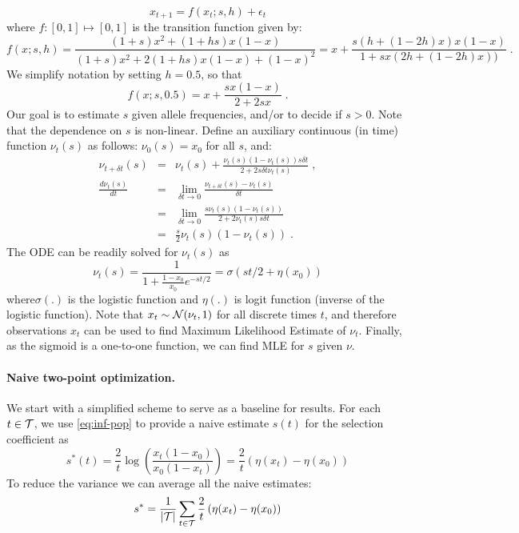 \begin{equation}
x_{t+1} = f(x_t;s,h) + \epsilon_t
\label{eq:trans0} 
\end{equation}
where $f: [0,1] \mapsto [0,1]$ is the
transition function given by:
\begin{equation}
f(x;s,h)=\frac{(1+s)x^2 + (1+hs)x(1-x)}{(1+s)x^2 + 2(1+hs)x(1-x) + (1-x)^2}
    =x+\frac{s(h+(1-2h)x)x(1-x)}{1+sx(2h+(1-2h)x))}\;.
\end{equation}
We simplify notation by setting $h=0.5$, so that
\begin{equation}
  f(x;s,0.5)=x+\frac{sx(1-x)}{2+2sx}\;.
  \label{eq:hequalshalf}
\end{equation}
Our goal is to estimate $s$ given allele frequencies, and/or to decide
if $s>0$. Note that the dependence on $s$ is non-linear. Define an
auxiliary continuous (in time) function $\nu_t(s)$ as follows:
$\nu_0(s)=x_0$ for all $s$, and:
\begin{eqnarray}
  \nu_{t+\delta t}(s) &=& \nu_t(s)+\frac{\nu_t(s)(1-\nu_t(s))s\delta t}{2+2s\delta t \nu_t(s)}\;,\\
  \frac{d\nu_t(s)}{dt} &=&\lim_{\delta t\rightarrow 0}\frac{\nu_{t+\delta t}(s) -\nu_t(s)}{\delta t}\\
   &=&\lim_{\delta t\rightarrow 0}\frac{s\nu_t(s)(1-\nu_t(s))}{2+2\nu_t(s)s\delta t}\\
   &=& \frac{s}{2}\nu_t(s)(1-\nu_t(s)) \;.
  \label{eq:ode}
\end{eqnarray}
The ODE can be readily solved for $\nu_t(s)$ as
\begin{equation}
  \nu_t(s) =\frac{1}{1+\frac{1-x_0}{x_0}e^{-st/2}} = \sigma(st/2+\eta(x_0)) 
  \label{eq:inf-pop}
\end{equation}
where$\sigma(.)$ is the logistic
function and $\eta(.)$ is logit function (inverse of the logistic function). Note that $x_t\sim{\cal N}(\nu_t,1)$ for all discrete times $t$,
and therefore observations $x_t$ can be used to find Maximum
Likelihood Estimate of $\nu_t$. Finally, as the sigmoid is a
one-to-one function, we can find MLE for $s$ given {\bf $\nu$}.

\paragraph{Naive two-point optimization.} We start with a simplified
scheme to serve as a baseline for results.  For each $t\in {\cal T}$, we
use \eqref{eq:inf-pop} to provide a naive estimate $s(t)$ for the
selection coefficient as
\begin{equation}
  s^*(t)=\frac{2}{t} \log \left( \frac{x_t(1-x_0)}{x_0 (1-x_t)} \right) = \frac{2}{t}  \left( \eta(x_t)-\eta(x_0)\right)
  \label{eq:naive2point}
\end{equation}
To reduce the variance we can average all the naive estimates: 
\begin{equation}
  s^*=\frac{1}{|{\cal T}|}\sum_{t\in {\cal T}}\frac{2}{t}  \left( \eta(x_t)-\eta(x_0)\right)
  \label{eq:naive}
\end{equation}


